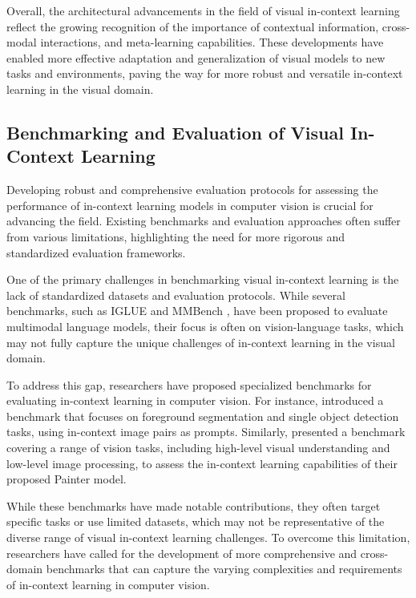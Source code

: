 \documentclass[11pt]{article}
\begin{document}
Overall, the architectural advancements in the field of visual in-context learning reflect the growing recognition of the importance of contextual information, cross-modal interactions, and meta-learning capabilities. These developments have enabled more effective adaptation and generalization of visual models to new tasks and environments, paving the way for more robust and versatile in-context learning in the visual domain.

\subsection{Benchmarking and Evaluation of Visual In-Context Learning}

Developing robust and comprehensive evaluation protocols for assessing the performance of in-context learning models in computer vision is crucial for advancing the field. Existing benchmarks and evaluation approaches often suffer from various limitations, highlighting the need for more rigorous and standardized evaluation frameworks.

One of the primary challenges in benchmarking visual in-context learning is the lack of standardized datasets and evaluation protocols. While several benchmarks, such as IGLUE \cite{ref245} and MMBench \cite{ref246}, have been proposed to evaluate multimodal language models, their focus is often on vision-language tasks, which may not fully capture the unique challenges of in-context learning in the visual domain.

To address this gap, researchers have proposed specialized benchmarks for evaluating in-context learning in computer vision. For instance, \cite{ref9} introduced a benchmark that focuses on foreground segmentation and single object detection tasks, using in-context image pairs as prompts. Similarly, \cite{ref247} presented a benchmark covering a range of vision tasks, including high-level visual understanding and low-level image processing, to assess the in-context learning capabilities of their proposed Painter model.

While these benchmarks have made notable contributions, they often target specific tasks or use limited datasets, which may not be representative of the diverse range of visual in-context learning challenges. To overcome this limitation, researchers have called for the development of more comprehensive and cross-domain benchmarks that can capture the varying complexities and requirements of in-context learning in computer vision.
\end{document}
